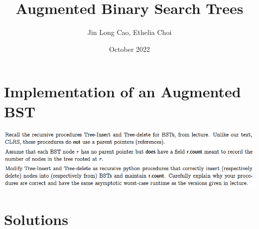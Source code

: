 \documentclass{article}
\title{Augmented Binary Search Trees}
\author{Jin Long Cao, Ethelia Choi}
\date{October 2022}
\begin{document}
\maketitle
\section*{Implementation of an Augmented BST}
\includegraphics[width=\textwidth]{Binary Search Trees}
\section*{Solutions}
\end{document}
